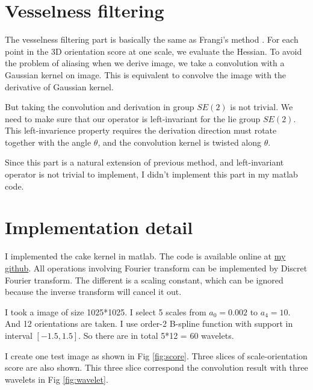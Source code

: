\documentclass{article}
\begin{document}
	\section{Vesselness filtering}
	The vesselness filtering part is basically the same as Frangi's method \cite{frangi1998multiscale}. For each point in the 3D orientation score at one scale, we evaluate the Hessian. To avoid the problem of aliasing when we derive image, we take a convolution with a Gaussian kernel on image. This is equivalent to convolve the image with the derivative of Gaussian kernel.
	
	But taking the convolution and derivation in group $SE(2)$ is not trivial. We need to make sure that our operator is left-invariant for the lie group $SE(2)$. This left-invarience property requires the derivation direction must rotate together with the angle $\theta$, and the convolution kernel is twisted along $\theta$. 
	
	Since this part is a natural extension of previous method, and left-invariant operator is not trivial to implement, I didn't implement this part in my matlab code.
	
	
	\section{Implementation detail}
	I implemented the cake kernel in matlab. The code is available online at \href{https://github.com/flm8620/Crossing-Preserving-Multi-scale-Vesselness}{my github}. All operations involving Fourier transform can be implemented by Discret Fourier transform. The different is a scaling constant, which can be ignored because the inverse transform will cancel it out.
	
	I took a image of size 1025*1025. I select 5 scales from $a_0=0.002$ to $a_4=10$. And 12 orientations are taken. I use order-2 B-spline function with support in interval $[-1.5, 1.5]$. So there are in total 5*12 = 60 wavelets.
	
	I create one test image as shown in Fig \ref{fig:score}. Three slices of scale-orientation score are also shown. This three slice correspond the convolution result with three wavelets in Fig \ref{fig:wavelet}.
	
\end{document}
